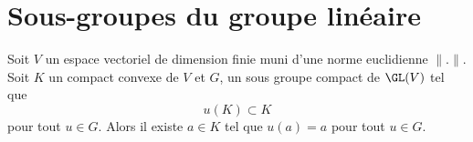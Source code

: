 \section{Sous-groupes du groupe linéaire}

\begin{lemma}       \label{LemOCtdiaE}
    Soit \( V\) un espace vectoriel de dimension finie muni d'une norme euclidienne \( \| . \|\). Soit \( K\) un compact convexe de \( V\) et \( G\), un sous groupe compact de \( \GL(V)\) tel que
    \begin{equation}
        u(K)\subset K
    \end{equation}
    pour tout \( u\in G\). Alors il existe \( a\in K\) tel que \( u(a)=a\) pour tout \( u\in G\).
\end{lemma}

